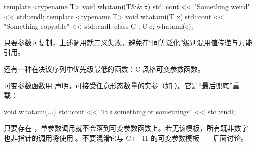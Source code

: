 \begin{code}
template <typename T> void whatami(T&& x) {
  std::cout << "Something weird" << std::endl;
}
template <typename T> void whatami(T x) {
  std::cout << "Something copyable" << std::endl;
}
class C {};
C c;
whatami(c);
\end{code}

只要参数可复制，上述调用就二义失败。避免在“同等泛化”级别混用值传递与万能引用。

还有一种在决议序列中优先级最低的函数：C 风格可变参数函数。

可变参数函数用  声明，可接受任意形态数量的实参（如 ）。它是“最后兜底”重载：

\begin{code}
void whatami(...) {
  std::cout << "It's something or somethings" << std::endl;
}
\end{code}

只要存在 ，单参数调用就不会落到可变参数函数上。若无该模板，所有既非数字也非指针的调用将使用 。不要混淆它与 C++11 的可变参数模板——后面讨论。

